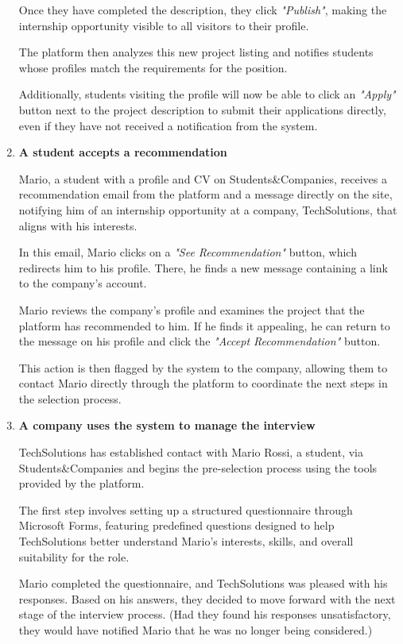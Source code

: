 \begin{enumerate}
    Once they have completed the description, they click \textit{"Publish"}, making the internship opportunity visible to all visitors to their profile.

    The platform then analyzes this new project listing and notifies students whose profiles match the requirements for the position. 
    
    
    Additionally, students visiting the profile will now be able to click an \textit{"Apply"} button next to the project description to submit their applications directly, even if they have not received a notification from the system.
    \item \textbf{A student accepts a recommendation}

    Mario, a student with a profile and CV on Students\&Companies, receives a recommendation email from the platform and a message directly on the site, notifying him of an internship opportunity at a company, TechSolutions, that aligns with his interests.
   
    In this email, Mario clicks on a \textit{"See Recommendation"} button, which redirects him to his profile. There, he finds a new message containing a link to the company’s account.

    Mario reviews the company’s profile and examines the project that the platform has recommended to him. If he finds it appealing, he can return to the message on his profile and click the \textit{"Accept Recommendation"} button.

    This action is then flagged by the system to the company, allowing them to contact Mario directly through the platform to coordinate the next steps in the selection process.
    \item \textbf{A company uses the system to manage the interview}

    TechSolutions has established contact with Mario Rossi, a student, via Students\&Companies and begins the pre-selection process using the tools provided by the platform.

    The first step involves setting up a structured questionnaire through Microsoft Forms, featuring predefined questions designed to help TechSolutions better understand Mario’s interests, skills, and overall suitability for the role.

    Mario completed the questionnaire, and TechSolutions was pleased with his responses. Based on his answers, they decided to move forward with the next stage of the interview process. (Had they found his responses unsatisfactory, they would have notified Mario that he was no longer being considered.)


\end{enumerate}

